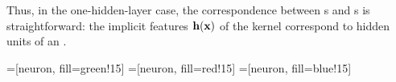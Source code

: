 \documentclass{article} %
\begin{document}
Thus, in the one-hidden-layer case, the correspondence between \MLP{}s and \gp{}s is straightforward:
the implicit features ${\bf{h}}({\bf{x}})$ of the kernel correspond to hidden units of an \MLP{}.


\newcommand{\numdims}[0]{3}
\newcommand{\numhidden}[0]{3}
\newcommand{\upnodedist}[0]{1cm}
\newcommand{\bardist}[0]{\hspace{-0.2cm}}

\def\layersep{2.3cm}
\def\nodesep{1.3cm}
\def\nodesize{1cm}


\newcommand{\neuronfunc}[2]{
\FPeval{\result}{clip(#1+#2)}
\texttt{[image: figures/deep-limits/two-d-draws/sqexp-draw-\\result]}
}

=[neuron, fill=green!15]
=[neuron, fill=red!15]
=[neuron, fill=blue!15]

\newcommand{\indfeat}{h}
\end{document}
